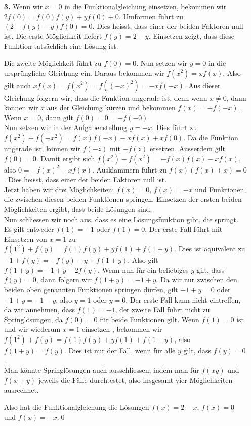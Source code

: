 \documentclass[12pt,a4paper]{article}
\theoremstyle{plain}
\theoremstyle{definition}
\begin{document}
\begin{itemize}
\item[\textbf{3.}]
Wenn wir $x=0$ in die Funktionalgleichung einsetzen, bekommen wir $2f(0)=f(0)f(y)+yf(0)+0$. Umformen führt zu $(2-f(y)-y)f(0)=0$. Dies heisst, dass einer der beiden Faktoren null ist.
Die erste Möglichkeit liefert $f(y)=2-y$. Einsetzen zeigt, dass diese Funktion tatsächlich eine Lösung ist.

Die zweite Möglichkeit führt zu $f(0)=0$. Nun setzen wir $y=0$ in die ursprüngliche Gleichung ein. Daraus bekommen wir $f(x^2)=xf(x)$. Also gilt auch $xf(x)=f(x^2)=f((-x)^2)=-xf(-x)$. Aus dieser Gleichung folgern wir, dass die Funktion ungerade ist, denn wenn $x\neq0$, dann können wir $x$ aus der Gleichung kürzen und bekommen $f(x)=-f(-x)$. Wenn $x=0$, dann gilt $f(0)=0=-f(-0)$.\\
Nun setzen wir in der Aufgabenstellung $y=-x$. Dies führt zu $f(x^2)+f(-x^2)=f(x)f(-x)-xf(x)+xf(0)$. Da die Funktion ungerade ist, können wir $f(-z)$ mit $-f(z)$ ersetzen. Ausserdem gilt $f(0)=0$. Damit ergibt sich $f(x^2)-f(x^2)=-f(x)f(x)-xf(x)$, also $0=-f(x)^2-xf(x)$. Ausklammern führt zu $f(x)(f(x)+x)=0$. Dies heisst, dass einer der beiden Faktoren null ist.\\
Jetzt haben wir drei Möglichkeiten: $f(x)=0$, $f(x)=-x$ und Funktionen, die zwischen diesen beiden Funktionen springen. Einsetzen der ersten beiden Möglichkeiten ergibt, dass beide Lösungen sind. \\
Nun schliessen wir noch aus, dass es eine Lösungsfunktion gibt, die springt. Es gilt entweder $f(1)=-1$ oder $f(1)=0$. Der erste Fall führt mit Einsetzen von $x=1$ zu $f(1^2)+f(y)=f(1)f(y)+yf(1)+f(1+y)$.  Dies ist äquivalent zu $-1+f(y)=-f(y)-y+f(1+y)$. Also gilt $f(1+y)=-1+y-2f(y)$. Wenn nun für ein beliebiges $y$ gilt, dass $f(y)=0$, dann folgern wir $f(1+y)=-1+y$. Da wir nur zwischen den beiden oben genannten Funktionen springen dürfen, gilt $-1+y=0$ oder $-1+y=-1-y$, also $y=1$ oder $y=0$. Der erste Fall kann nicht eintreffen, da wir annehmen, dass $f(1)=-1$, der zweite Fall führt nicht zu Springlösungen, da $f(0)=0$ für beide Funktionen gilt.
Wenn $f(1)=0$ ist und wir wiederum $x=1$ einsetzen , bekommen wir $f(1^2)+f(y)=f(1)f(y)+yf(1)+f(1+y)$, also $f(1+y)=f(y)$. Dies ist nur der Fall, wenn für alle $y$ gilt, dass $f(y)=0$.\\
Man könnte Springlösungen auch ausschliessen, indem man für $f(xy)$ und $f(x+y)$ jeweils die Fälle durchtestet, also insgesamt vier Möglichkeiten ausrechnet.

Also hat die Funktionalgleichung die Lösungen $f(x)=2-x$, $f(x)=0$ und $f(x)=-x$.\qed



\end{itemize}
\end{document}
